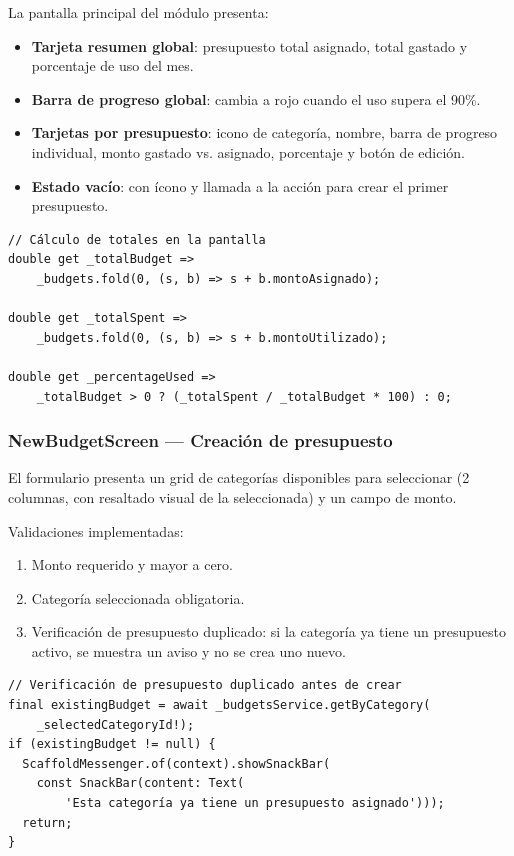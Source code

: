 \documentclass[12pt, letterpaper]{article}
\begin{document}
La pantalla principal del módulo presenta:

\begin{itemize}
  \item \textbf{Tarjeta resumen global}: presupuesto total asignado,
        total gastado y porcentaje de uso del mes.
  \item \textbf{Barra de progreso global}: cambia a rojo cuando el uso
        supera el 90\%.
  \item \textbf{Tarjetas por presupuesto}: icono de categoría, nombre,
        barra de progreso individual, monto gastado vs. asignado,
        porcentaje y botón de edición.
  \item \textbf{Estado vacío}: con ícono y llamada a la acción para crear
        el primer presupuesto.
\end{itemize}

\begin{lstlisting}
// Cálculo de totales en la pantalla
double get _totalBudget =>
    _budgets.fold(0, (s, b) => s + b.montoAsignado);

double get _totalSpent =>
    _budgets.fold(0, (s, b) => s + b.montoUtilizado);

double get _percentageUsed =>
    _totalBudget > 0 ? (_totalSpent / _totalBudget * 100) : 0;
\end{lstlisting}

\subsubsection{NewBudgetScreen — Creación de presupuesto}

El formulario presenta un grid de categorías disponibles para seleccionar
(2 columnas, con resaltado visual de la seleccionada) y un campo de monto.

Validaciones implementadas:
\begin{enumerate}
  \item Monto requerido y mayor a cero.
  \item Categoría seleccionada obligatoria.
  \item Verificación de presupuesto duplicado: si la categoría ya tiene
        un presupuesto activo, se muestra un aviso y no se crea uno nuevo.
\end{enumerate}

\begin{lstlisting}
// Verificación de presupuesto duplicado antes de crear
final existingBudget = await _budgetsService.getByCategory(
    _selectedCategoryId!);
if (existingBudget != null) {
  ScaffoldMessenger.of(context).showSnackBar(
    const SnackBar(content: Text(
        'Esta categoría ya tiene un presupuesto asignado')));
  return;
}
\end{lstlisting}
\end{document}
